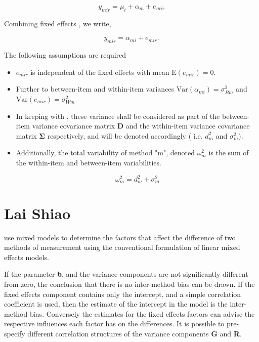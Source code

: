 \documentclass[12pt, a4paper]{report}
\theoremstyle{plain}
\theoremstyle{definition}
\theoremstyle{remark}
\begin{document}
	\[ y_{mir} = \mu_{i} + \alpha_{m} + e_{mir}  \]
	
	Combining fixed effects \citep{barnhart}, we write,
	
	\[ y_{mir} = \alpha_{mi} + e_{mir}.\]
	
	The following assumptions are required
	
	\begin{itemize}
		\item $e_{mir}$ is independent of the fixed effects with mean $\mbox{E}(e_{mir}) = 0$.
		\item Further to \citet{barnhart} between-item and within-item variances $\mbox{Var}(\alpha_{mi}) = \sigma^2_{Bm}$ and $\mbox{Var}(e_{mir}) = \sigma^2_{Wm}$
		\item In keeping with \citet{ARoy2009}, these variance shall be considered as part of the between-item variance covariance matrix $\boldsymbol{D}$ and the within-item variance covariance matrix  $\boldsymbol{\Sigma}$
		respectively, and will be denoted accordingly ( i.e. $d^2_{m}$ and $\sigma^2_{m}$).
		\item Additionally, the total variability of method "m", denoted $\omega^2_m$ is the sum of the within-item and between-item variabilities.
		
		\[ \omega^2_m = d^2_{m}+ \sigma^2_{m} \]
		
	\end{itemize}
	\newpage
	
	
\section{Lai Shiao}
\citet{LaiShiao} use mixed models to determine the factors that
affect the difference of two methods of measurement using the
conventional formulation of linear mixed effects models.

If the parameter \textbf{b}, and the variance components are not
significantly different from zero, the conclusion that there is no
inter-method bias can be drawn. If the fixed effects component
contains only the intercept, and a simple correlation coefficient
is used, then the estimate of the intercept in the model is the
inter-method bias. Conversely the estimates for the fixed effects
factors can advise the respective influences each factor has on
the differences. It is possible to pre-specify different
correlation structures of the variance components \textbf{G} and
\textbf{R}.
\end{document}
